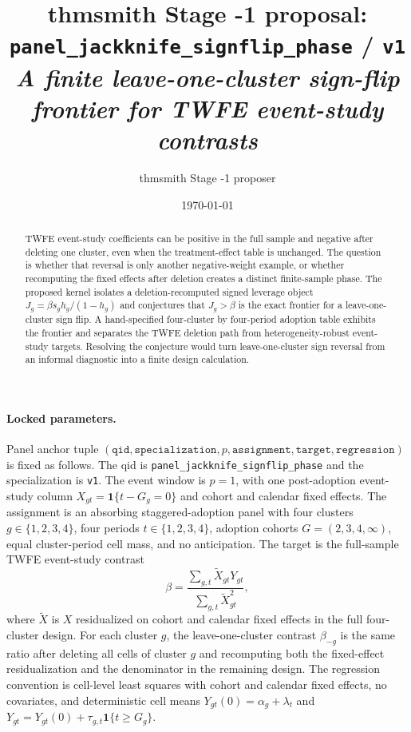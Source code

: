\documentclass[11pt]{article}
\title{thmsmith Stage -1 proposal: \texttt{panel\_jackknife\_signflip\_phase} / \texttt{v1}%
  \\ \large\textit{A finite leave-one-cluster sign-flip frontier for TWFE event-study contrasts}}
\author{thmsmith Stage -1 proposer}
\date{\today}
\newcommand{\one}{\mathbf{1}}
\theoremstyle{definition}
\theoremstyle{plain}
\theoremstyle{remark}
\begin{document}
\maketitle


\paragraph{Locked parameters.}
Panel anchor tuple $(\texttt{qid},\texttt{specialization},p,\texttt{assignment},\texttt{target},\texttt{regression})$ is fixed as follows. The qid is \texttt{panel\_jackknife\_signflip\_phase} and the specialization is \texttt{v1}. The event window is $p=1$, with one post-adoption event-study column $X_{gt}=\one\{t-G_g=0\}$ and cohort and calendar fixed effects. The assignment is an absorbing staggered-adoption panel with four clusters $g\in\{1,2,3,4\}$, four periods $t\in\{1,2,3,4\}$, adoption cohorts $G=(2,3,4,\infty)$, equal cluster-period cell mass, and no anticipation. The target is the full-sample TWFE event-study contrast
\[
\beta=\frac{\sum_{g,t}\tilde X_{gt}Y_{gt}}{\sum_{g,t}\tilde X_{gt}^{2}},
\]
where $\tilde X$ is $X$ residualized on cohort and calendar fixed effects in the full four-cluster design. For each cluster $g$, the leave-one-cluster contrast $\beta_{-g}$ is the same ratio after deleting all cells of cluster $g$ and recomputing both the fixed-effect residualization and the denominator in the remaining design. The regression convention is cell-level least squares with cohort and calendar fixed effects, no covariates, and deterministic cell means $Y_{gt}(0)=\alpha_g+\lambda_t$ and $Y_{gt}=Y_{gt}(0)+\tau_{g,t}\one\{t\geq G_g\}$.

\begin{abstract}
TWFE event-study coefficients can be positive in the full sample and negative after deleting one cluster, even when the treatment-effect table is unchanged. The question is whether that reversal is only another negative-weight example, or whether recomputing the fixed effects after deletion creates a distinct finite-sample phase. The proposed kernel isolates a deletion-recomputed signed leverage object $J_g=\beta s_g h_g/(1-h_g)$ and conjectures that $J_g>\beta$ is the exact frontier for a leave-one-cluster sign flip. A hand-specified four-cluster by four-period adoption table exhibits the frontier and separates the TWFE deletion path from heterogeneity-robust event-study targets. Resolving the conjecture would turn leave-one-cluster sign reversal from an informal diagnostic into a finite design calculation.
\end{abstract}
\end{document}

